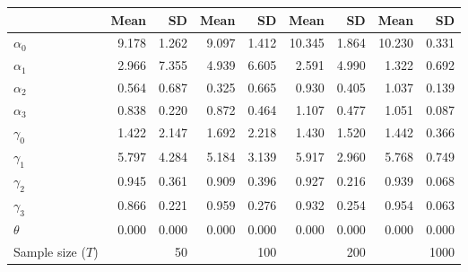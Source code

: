 
\begin{tabular}[t]{lrrrrrrrr}
\toprule
  & Mean & SD & Mean  & SD  & Mean   & SD   & Mean    & SD   \\
\midrule
$\alpha_{0}$ & 9.178 & 1.262 & 9.097 & 1.412 & 10.345 & 1.864 & 10.230 & 0.331\\
$\alpha_{1}$ & 2.966 & 7.355 & 4.939 & 6.605 & 2.591 & 4.990 & 1.322 & 0.692\\
$\alpha_{2}$ & 0.564 & 0.687 & 0.325 & 0.665 & 0.930 & 0.405 & 1.037 & 0.139\\
$\alpha_{3}$ & 0.838 & 0.220 & 0.872 & 0.464 & 1.107 & 0.477 & 1.051 & 0.087\\
$\gamma_{0}$ & 1.422 & 2.147 & 1.692 & 2.218 & 1.430 & 1.520 & 1.442 & 0.366\\
$\gamma_{1}$ & 5.797 & 4.284 & 5.184 & 3.139 & 5.917 & 2.960 & 5.768 & 0.749\\
$\gamma_{2}$ & 0.945 & 0.361 & 0.909 & 0.396 & 0.927 & 0.216 & 0.939 & 0.068\\
$\gamma_{3}$ & 0.866 & 0.221 & 0.959 & 0.276 & 0.932 & 0.254 & 0.954 & 0.063\\
$\theta$ & 0.000 & 0.000 & 0.000 & 0.000 & 0.000 & 0.000 & 0.000 & 0.000\\
Sample size ($T$) &  & 50 &  & 100 &  & 200 &  & 1000\\
\bottomrule
\end{tabular}
